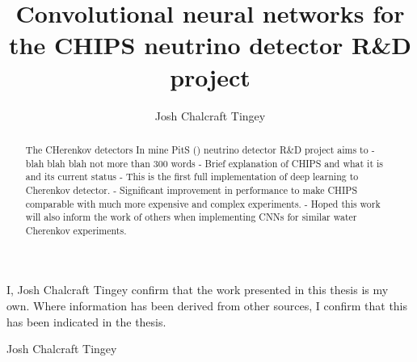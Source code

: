 
\title{Convolutional neural networks for the CHIPS neutrino detector R\&D project}
\author{Josh Chalcraft Tingey}

\thispagestyle{plain}

\begin{declaration} %
    I, Josh Chalcraft Tingey confirm that the work presented in this thesis is my own. Where
    information has been derived from other sources, I confirm that this has been indicated in the
    thesis.
    \vspace*{1cm}
    \begin{flushright}
        Josh Chalcraft Tingey
    \end{flushright}
\end{declaration}

\begin{abstract} %
    The CHerenkov detectors In mine PitS (\chips) neutrino detector R\&D project aims to - blah
    blah blah not more than 300 words - Brief explanation of CHIPS and what it is and its current
    status - This is the first full implementation of deep learning to Cherenkov detector. -
    Significant improvement in performance to make CHIPS comparable with much more expensive and
    complex experiments. - Hoped this work will also inform the work of others when implementing
    CNNs for similar water Cherenkov experiments.
\end{abstract}

